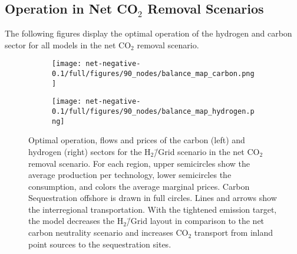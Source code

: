 \documentclass[twocolumn]{article}
\newcommand{\carbon}{CO$_2$}
\newcommand{\hydrogengrid}{H$_2$\=/Grid}
\newcommand{\hydrogenscenario}{H$_2$\=/Grid scenario}
\newcommand{\hybridscenario}{Hybrid scenario}
\begin{document}





\clearpage
\subsection{Operation in Net \carbon{} Removal Scenarios}
\label{sec:operation_nn}
The following figures display the optimal operation of the hydrogen and carbon sector for all models in the net \carbon{} removal scenario.


\begin{figure}[ht!]
    \centering
    \begin{subfigure}{.5\textwidth}
        \centering
        \texttt{[image: net-negative-0.1/full/figures/90\_nodes/balance\_map\_carbon.png]}
        \label{fig:balance_map_carbon_full_nn}
    \end{subfigure}%
    \begin{subfigure}{.5\textwidth}
        \centering
        \texttt{[image: net-negative-0.1/full/figures/90\_nodes/balance\_map\_hydrogen.png]}
        \label{fig:balance_map_hydrogen_full_nn}
    \end{subfigure}
    \caption{Optimal operation, flows and prices of the carbon (left) and hydrogen (right) sectors for the \hydrogenscenario{} in the net \carbon{} removal scenario. For each region, upper semicircles show the average production per technology, lower semicircles the consumption, and colors the average marginal prices. Carbon Sequestration offshore is drawn in full circles. Lines and arrows show the interregional transportation. With the tightened emission target, the model decreases the \hydrogengrid{} layout in comparison to the net carbon neutrality scenario and increases \carbon{} transport from inland point sources to the sequestration sites.
    }
    \label{fig:balance_maps_full_nn}
\end{figure}
\end{document}

